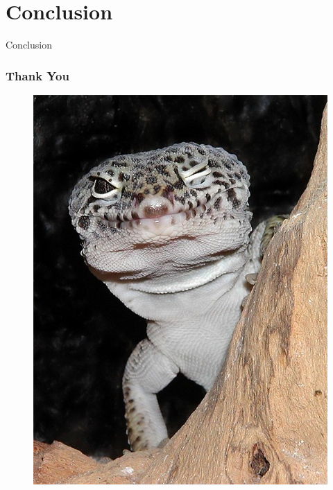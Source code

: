 \documentclass{beamer}
\begin{document}
\section{Conclusion}
\begin{frame}
 Conclusion
\end{frame}

\begin{frame}
 \frametitle{Thank You}
 \begin{figure}
  \centering
  \includegraphics[width=.3\textwidth]{Diagrams/geckowink.jpg}
 \end{figure}
\end{frame}
\end{document}
